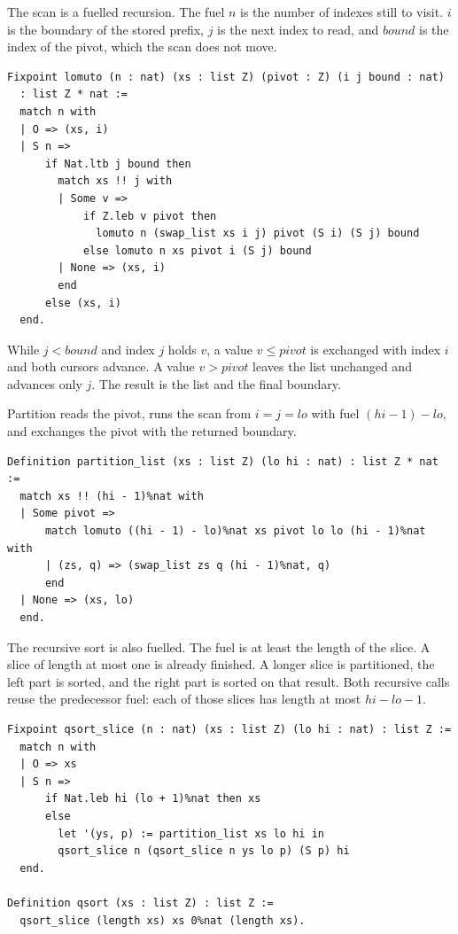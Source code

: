 \documentclass[11pt]{article}
\begin{document}
The scan is a fuelled recursion.
The fuel \(n\) is the number of indexes still to visit.
\(i\) is the boundary of the stored prefix, \(j\) is the next index to read, and \(\mathit{bound}\) is the index of the pivot, which the scan does not move.

\begin{lstlisting}
Fixpoint lomuto (n : nat) (xs : list Z) (pivot : Z) (i j bound : nat)
  : list Z * nat :=
  match n with
  | O => (xs, i)
  | S n =>
      if Nat.ltb j bound then
        match xs !! j with
        | Some v =>
            if Z.leb v pivot then
              lomuto n (swap_list xs i j) pivot (S i) (S j) bound
            else lomuto n xs pivot i (S j) bound
        | None => (xs, i)
        end
      else (xs, i)
  end.
\end{lstlisting}

While \(j < \mathit{bound}\) and index \(j\) holds \(v\), a value \(v \le \mathit{pivot}\) is exchanged with index \(i\) and both cursors advance.
A value \(v > \mathit{pivot}\) leaves the list unchanged and advances only \(j\).
The result is the list and the final boundary.

Partition reads the pivot, runs the scan from \(i = j = lo\) with fuel \((hi - 1) - lo\), and exchanges the pivot with the returned boundary.

\begin{lstlisting}
Definition partition_list (xs : list Z) (lo hi : nat) : list Z * nat :=
  match xs !! (hi - 1)%nat with
  | Some pivot =>
      match lomuto ((hi - 1) - lo)%nat xs pivot lo lo (hi - 1)%nat with
      | (zs, q) => (swap_list zs q (hi - 1)%nat, q)
      end
  | None => (xs, lo)
  end.
\end{lstlisting}

The recursive sort is also fuelled.
The fuel is at least the length of the slice.
A slice of length at most one is already finished.
A longer slice is partitioned, the left part is sorted, and the right part is sorted on that result.
Both recursive calls reuse the predecessor fuel: each of those slices has length at most \(hi - lo - 1\).

\begin{lstlisting}
Fixpoint qsort_slice (n : nat) (xs : list Z) (lo hi : nat) : list Z :=
  match n with
  | O => xs
  | S n =>
      if Nat.leb hi (lo + 1)%nat then xs
      else
        let '(ys, p) := partition_list xs lo hi in
        qsort_slice n (qsort_slice n ys lo p) (S p) hi
  end.

Definition qsort (xs : list Z) : list Z :=
  qsort_slice (length xs) xs 0%nat (length xs).
\end{lstlisting}
\end{document}
